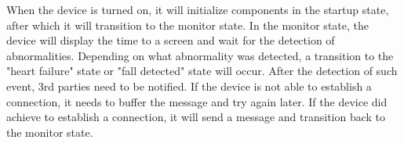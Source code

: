 \documentclass{article}
\begin{document}

\noindent
When the device is turned on, it will initialize components in the startup state, after which it will transition to the monitor state.
In the monitor state, the device will display the time to a screen and wait for the detection of abnormalities.
Depending on what abnormality was detected, a transition to the "heart failure" state or "fall detected" state will occur.
After the detection of such event, 3rd parties need to be notified.
If the device is not able to establish a connection, it needs to buffer the message and try again later.
If the device did achieve to establish a connection, it will send a message and transition back to the monitor state.

\clearpage



%

\end{document}
